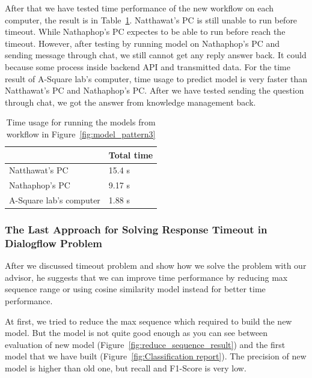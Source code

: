 \documentclass[12pt,oneside,openright,a4paper]{cpe-english-project}
\begin{document}
After that we have tested time performance of the new workflow on each computer,
the result is in Table~\ref*{tab:run_time_pattern3_table}.
Natthawat's PC is still unable to run before timeout.
While Nathaphop's PC expectes to be able to run before reach the timeout.
However, after testing by running model on Nathaphop's PC and sending message through chat,
we still cannot get any reply answer back. It could because some process inside backend API and transmitted data.
For the time result of A-Square lab's computer, time usage to predict model is very faster than
Natthawat's PC and Nathaphop's PC.
After we have tested sending the question through chat, we got the answer from knowledge management back.

\begin{table}[h]
	\centering
	\caption{Time usage for running the models from workflow in Figure~\ref*{fig:model_pattern3}}
	\label{tab:run_time_pattern3_table}
	\begin{adjustbox}{width=\textwidth}
		\begin{tabular}{|l|l|}
			\hline
			\backslashbox{Computer name}{Time usage to predict each model} &Total time \\ \hline
			Natthawat's PC & 15.4 s \\ \hline
			Nathaphop's PC & 9.17 s \\ \hline
			A-Square lab's computer & 1.88 s \\ \hline
		\end{tabular}
	\end{adjustbox}
\end{table}

\subsubsection{The Last Approach for Solving Response Timeout in Dialogflow Problem}
After we discussed timeout problem and show how we solve the problem with our advisor,
he suggests that we can improve time performance by reducing max sequence range or using
cosine similarity model instead for better time performance.

At first, we tried to reduce the max sequence which required to build the new model.
But the model is not quite good enough as you can see between evaluation of new model
(Figure~\ref*{fig:reduce_sequence_result}) and the first model that we have built
(Figure~\ref*{fig:Classification report}). The precision of new model is higher than old
one, but recall and F1-Score is very low.
\end{document}
